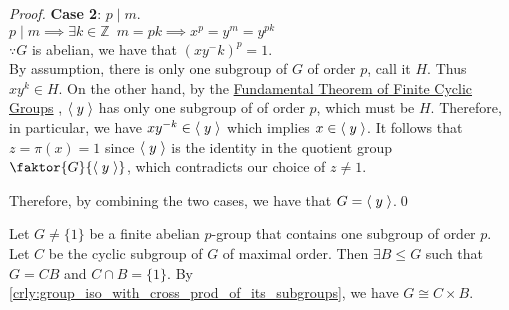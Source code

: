 \begin{proof}
  \noindent\textbf{Case 2}: $p \mid m$.\\
  $p \mid m \implies \exists k \in \mathbb{Z} \enspace m = pk \implies x^p = y^m = y^{pk}$ \\
  $\because G$ is abelian, we have that $\left( xy^-k \right)^p = 1$. \\
  By assumption, there is only one subgroup of $G$ of order $p$, call it $H$. Thus $xy^k \in H$. On the other hand, by the \hyperref[thm:fundamental_theorem_of_finite_cyclic_groups]{Fundamental Theorem of Finite Cyclic Groups} , $\langle \; y \; \rangle$ has only one subgroup of of order $p$, which must be $H$. Therefore, in particular, we have $xy^{-k} \in \langle \; y \; \rangle$ which implies $x \in \langle \; y \; \rangle$. It follows that $z = \pi(x) = 1$ since $\langle \; y \; \rangle$ is the identity in the quotient group $\faktor{G}{\lra{y}}$, which contradicts our choice of $z \neq 1$.

  Therefore, by combining the two cases, we have that $G = \langle \; y \; \rangle$.\qed
\end{proof}

\begin{propo}
\label{propo:p_gp_broken_down}
  Let $G \neq \{1\}$ be a finite abelian $p$-group that contains one subgroup of order $p$. Let $C$ be the cyclic subgroup of $G$ of maximal order. Then $\exists B \leq G$ such that $G = CB$ and $C \cap B = \{1\}$. By \cref{crly:group_iso_with_cross_prod_of_its_subgroups}, we have $G \cong C \times B$.
\end{propo}


